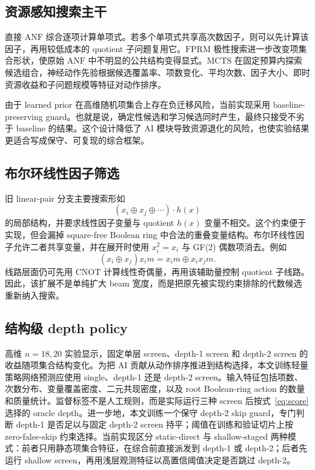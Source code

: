\documentclass[UTF8,fontset=macnew,11pt]{ctexart}
\newcommand{\anf}{\ensuremath{\mathrm{ANF}}}
\newcommand{\fprm}{\ensuremath{\mathrm{FPRM}}}
\newcommand{\mcts}{\ensuremath{\mathrm{MCTS}}}
\begin{document}
\subsection{资源感知搜索主干}

直接 \anf{} 综合逐项计算单项式。若多个单项式共享高次数因子，则可以先计算该因子，再用较低成本的 quotient 子问题复用它。\fprm{} 极性搜索进一步改变项集合形状，使原始 \anf{} 中不明显的公共结构变得显式。\mcts{} 在固定预算内探索候选组合，神经动作先验根据候选覆盖率、项数变化、平均次数、因子大小、即时资源收益和子问题规模等特征对动作排序。

由于 learned prior 在高维随机项集合上存在负迁移风险，当前实现采用 baseline-preserving guard。也就是说，确定性候选和学习候选同时产生，最终只接受不劣于 baseline 的结果。这个设计降低了 AI 模块导致资源退化的风险，也使实验结果更适合写成保守、可复现的综合框架。

\subsection{布尔环线性因子筛选}

旧 linear-pair 分支主要搜索形如
\begin{equation}
  (x_i\oplus x_j\oplus\cdots)\cdot h(x)
  \label{eq:linear_factor}
\end{equation}
的局部结构，并要求线性因子变量与 quotient $h(x)$ 变量不相交。这个约束便于实现，但会漏掉 square-free Boolean ring 中合法的重叠变量结构。布尔环线性因子允许二者共享变量，并在展开时使用 $x_i^2=x_i$ 与 GF(2) 偶数项消去。例如
\begin{equation}
  (x_i\oplus x_j)x_i m = x_i m \oplus x_i x_j m .
  \label{eq:boolean_ring}
\end{equation}
线路层面仍可先用 CNOT 计算线性奇偶量，再用该辅助量控制 quotient 子线路。因此，该扩展不是单纯扩大 beam 宽度，而是把原先被实现约束排除的代数候选重新纳入搜索。

\subsection{结构级 depth policy}

高维 $n=18,20$ 实验显示，固定单层 screen、depth-1 screen 和 depth-2 screen 的收益随项集合结构变化。为把 AI 贡献从动作排序推进到结构选择，本文训练轻量策略网络预测应使用 single、depth-1 还是 depth-2 screen。输入特征包括项数、次数分布、变量覆盖密度、二元共现密度，以及 root Boolean-ring action 的数量和质量统计。监督标签不是人工规则，而是实际运行三种 screen 后按式~\eqref{eq:score} 选择的 oracle depth。进一步地，本文训练一个保守 depth-2 skip guard，专门判断 depth-1 是否足以与固定 depth-2 screen 持平；阈值在训练和验证切片上按 zero-false-skip 约束选择。当前实现区分 static-direct 与 shallow-staged 两种模式：前者只用静态项集合特征，在综合前直接派发到 depth-1 或 depth-2；后者先运行 shallow screen，再用浅层观测特征以高置信阈值决定是否跳过 depth-2。
\end{document}
